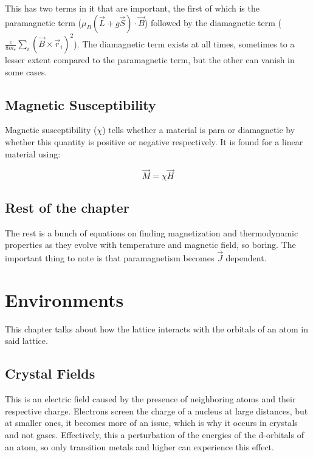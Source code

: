\documentclass[11pt,onecolumn]{article}
\begin{document}
This has two terms in it that are important, the first of which is the paramagnetic term ($\mu_B(\vec{L}+g\vec{S})\cdot\vec{B}$) followed by the diamagnetic term ($\frac{e}{8m_e}\sum_{i}(\vec{B}\times\vec{r}_i)^2$). The diamagnetic term exists at all times, sometimes to a lesser extent compared to the paramagnetic term, but the other can vanish in some cases.

\subsection{Magnetic Susceptibility}

Magnetic susceptibility ($\chi$) tells whether a material is para or diamagnetic by whether this quantity is positive or negative respectively. It is found for a linear material using:

\begin{equation*}
\vec{M}=\chi\vec{H}
\end{equation*}

\subsection{Rest of the chapter}

The rest is a bunch of equations on finding magnetization and thermodynamic properties as they evolve with temperature and magnetic field, so boring. The important thing to note is that paramagnetism becomes $\vec{J}$ dependent.

\section{Environments}

This chapter talks about how the lattice interacts with the orbitals of an atom in said lattice.

\subsection{Crystal Fields}

This is an electric field caused by the presence of neighboring atoms and their respective charge. Electrons screen the charge of a nucleus at large distances, but at smaller ones, it becomes more of an issue, which is why it occurs in crystals and not gases. Effectively, this a perturbation of the energies of the d-orbitals of an atom, so only transition metals and higher can experience this effect.\\
\end{document}
